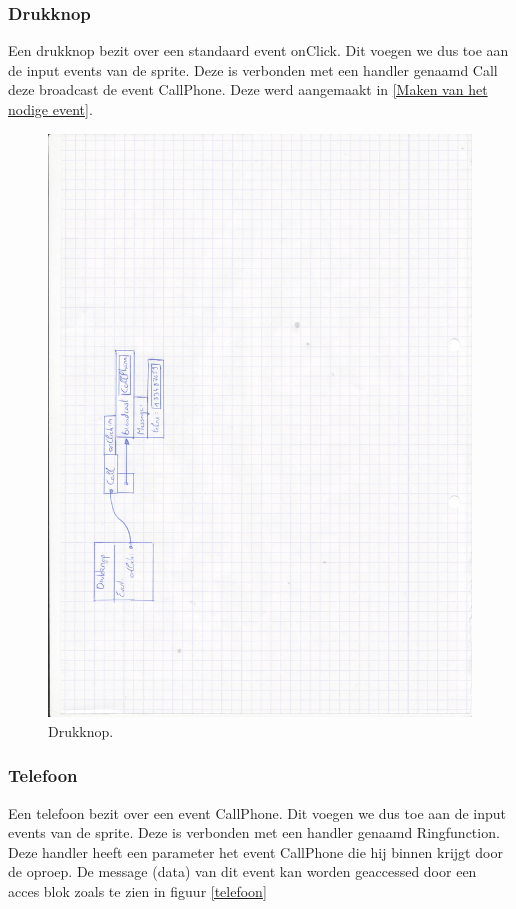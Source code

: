 \documentclass[]{article}
\begin{document}
\subsubsection{Drukknop}
Een drukknop bezit over een standaard event onClick. Dit voegen we dus toe aan de input events van de sprite. Deze is verbonden met een handler genaamd Call deze broadcast de event CallPhone. Deze werd aangemaakt in \ref{Maken van het nodige event}.
 \begin{figure}
  \centering
\includegraphics[scale=0.15]{mockups/drukknop.jpg}
  \caption{Drukknop.} 
\end{figure} 
\subsubsection{Telefoon}
Een telefoon bezit over een event CallPhone. Dit voegen we dus toe aan de input events van de sprite. Deze is verbonden met een handler genaamd Ringfunction. Deze handler heeft een parameter het event CallPhone die hij binnen krijgt door de oproep. De message (data) van dit event kan worden geaccessed door een acces blok zoals te zien in figuur \ref{telefoon}
\end{document}

